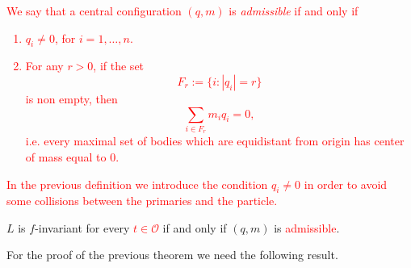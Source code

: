 \documentclass[smallcondensed]{svjour3}
\begin{document}
\textcolor{red}{
\begin{definition}
We say that a
central configuration $(q,m)$ is \emph{admissible} if and only if
\begin{enumerate}
 \item  $q_i\neq 0$, for $i=1,\ldots,n$.
 \item For any $r>0$, if the set
\[F_r:=\{i:|q_i|=r\}\]
is non empty, then
\begin{equation}\label{eq:suma0}\sum_{i\in F_r}m_iq_i=0,\end{equation}
i.e. every maximal set of  bodies which are equidistant from origin has center of mass equal to $0$.
\end{enumerate}
\end{definition}
}

\textcolor{red}{\begin{remark}In the previous definition we introduce the condition $q_i\neq 0$  in order to avoid some collisions between the primaries and the particle.\end{remark}}

\begin{theorem}\label{thm:prim} $L$ is $f$-invariant for every \textcolor{red}{$t\in\mathcal{O}$} if and only if $(q,m)$ is \textcolor{red}{admissible}.
\end{theorem}

For the proof of the previous theorem we need the following result.
\end{document}
